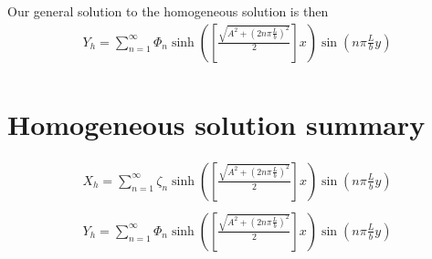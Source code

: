 \documentclass[11pt]{article}
\begin{document}
Our general solution to the homogeneous solution is then
\begin{equation}\begin{aligned}
Y_h = \sum_{n=1}^{\infty} \Phi_n \sinh \left( \left[\frac{\sqrt{A^2 + \left(2 n \pi \frac{L}{b} \right)^2}}{2}\right] x \right) \sin \left(n \pi \frac{L}{b} y \right) \\
\end{aligned} \end{equation}

\section{Homogeneous solution summary}
\begin{equation}\begin{aligned}
X_h = \sum_{n=1}^{\infty} \zeta_n \sinh \left( \left[\frac{\sqrt{A^2 + \left(2 n \pi \frac{L}{b} \right)^2}}{2}\right] x \right) \sin \left(n \pi \frac{L}{b} y \right) \\
\end{aligned} \end{equation}
\begin{equation}\begin{aligned}
Y_h = \sum_{n=1}^{\infty} \Phi_n \sinh \left( \left[\frac{\sqrt{A^2 + \left(2 n \pi \frac{L}{b} \right)^2}}{2}\right] x \right) \sin \left(n \pi \frac{L}{b} y \right) \\
\end{aligned} \end{equation}
\end{document}
